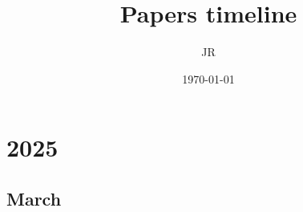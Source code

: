 \documentclass[12pt]{article}
\begin{document}
\title{\Large Papers timeline}
\author{JR}
\date{\today}

\maketitle

\tableofcontents

\newpage
\section{2025}

\subsection{March}
\begin{refsection}
    \nocite{jiang2025tokenefficientlongvideounderstanding}
    \printbibliography[heading=none]
\end{refsection}





\end{document}
